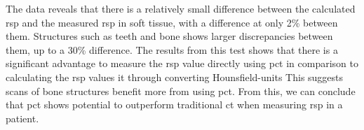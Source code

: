 \documentclass[main.tex]{subfiles}
\begin{document}
The data reveals that there is a relatively small difference between the calculated \gls{rsp} and the measured \gls{rsp} in soft tissue, with a difference at only 2\% between them. Structures such as teeth and bone shows larger discrepancies between them, up to a 30\% difference. The results from this test shows that there is a significant advantage to measure the \gls{rsp} value directly using \gls{pct} in comparison to calculating the \gls{rsp} values  it through converting Hounsfield-units This suggests scans of bone structures benefit more from using \gls{pct}. From this, we can conclude that \gls{pct} shows potential to outperform traditional \gls{ct} when measuring \gls{rsp} in a patient.
\end{document}
